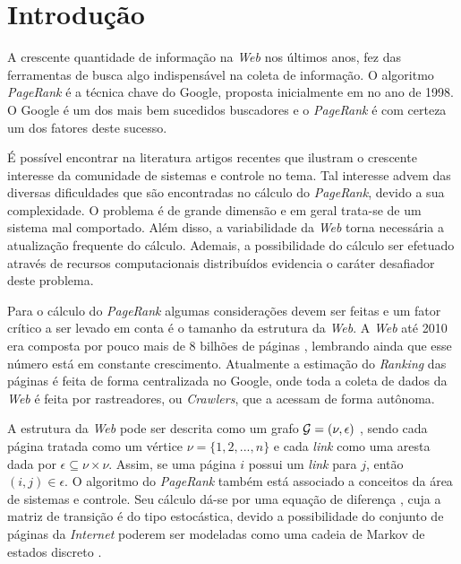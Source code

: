 \chapter{Introdução}%

A crescente quantidade de informação na \textit{Web} nos últimos anos, fez das ferramentas de busca algo indispensável na coleta de informação. O algoritmo \textit{PageRank} é a técnica chave do Google, proposta inicialmente em \cite{brin2012reprint} no ano de 1998. O Google é um dos mais bem sucedidos buscadores e o \textit{PageRank} é com certeza um dos fatores deste sucesso.

É possível encontrar na literatura artigos recentes \cite{lei2015distributed,ishii2014pagerank} que ilustram o crescente interesse da comunidade de sistemas e controle no tema. Tal interesse advem das diversas dificuldades que são encontradas no cálculo do \textit{PageRank}, devido a sua complexidade. O problema é de grande dimensão e em geral trata-se de um sistema mal comportado. Além disso, a variabilidade da \textit{Web} torna necessária a atualização frequente do cálculo. Ademais, a possibilidade do cálculo ser efetuado através de recursos computacionais distribuídos \cite{ishiiTAC12} evidencia o caráter desafiador deste problema.

Para o cálculo do \textit{PageRank} algumas considerações devem ser feitas e um fator crítico a ser levado em conta é o tamanho da estrutura da \textit{Web}. A \textit{Web} até 2010 era composta por pouco mais de 8 bilhões de páginas \cite{ishiiTAC10}, lembrando ainda que esse número está em constante crescimento. Atualmente a estimação do \textit{Ranking} das páginas é feita de forma centralizada no Google, onde toda a coleta de dados da \textit{Web} é feita por rastreadores, ou \textit{Crawlers}, que a acessam de forma autônoma.

A estrutura da \textit{Web} pode ser descrita como um grafo ${\cal G} = (\nu,\epsilon)$ \cite{ishiiSCL12}, sendo cada página tratada como um vértice $\nu = \lbrace 1, 2, ..., n \rbrace$ e cada \textit{link} como uma aresta dada por $\epsilon \subseteq \nu \times \nu$. Assim, se uma página $i$ possui um \textit{link} para $j$, então $(i,j) \in \epsilon$. O algoritmo do \textit{PageRank} também está associado a conceitos da área de sistemas e controle. Seu cálculo dá-se por uma equação de diferença \cite{pagerankSIREV}, cuja a matriz de transição é do tipo estocástica, devido a possibilidade do conjunto de páginas da \textit{Internet} poderem ser modeladas como uma cadeia de Markov de estados discreto \cite{costafragosomarques}. 

